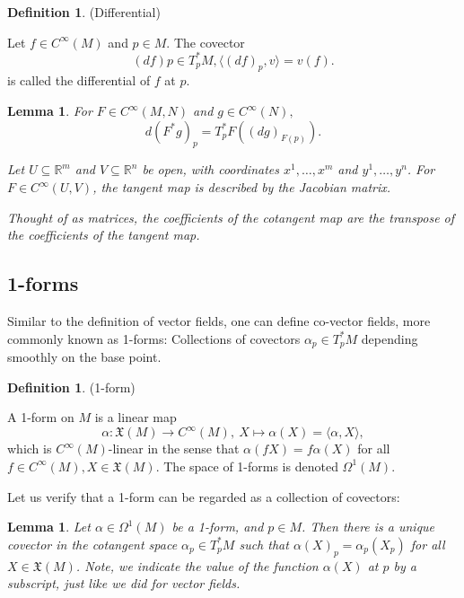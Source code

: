 \documentclass{article}
\newtheorem{lemma}[theorem]{Lemma}
\theoremstyle{definition}
\newtheorem{defn}[theorem]{Definition}
\newenvironment{definition}
  {\vspace{8pt}\begin{mdframed}[backgroundcolor=blueish]\begin{defn}}
  {\end{defn}\end{mdframed}\vspace{4pt}}
\begin{document}
\begin{definition} (Differential)

Let $f \in C^\infty(M)$ and $p \in M$. The covector 
\[
    (d f)p \in T^*_p M,  \langle (d f)_p, v\rangle = v(f).
\]
is called the differential of $f$ at $p$.

\end{definition}

\begin{lemma}
For $F \in C^\infty(M,N)$ and $g \in C^\infty(N),$
\[
    d(F^* g)_p = T^*_p F((dg)_{F(p)}).
\]

Let $U \subseteq \mathbb R^m$ and $V \subseteq \mathbb R^n$ be open, with coordinates $x^1 , \dots , x^m$ and $y^1,\dots, y^n$. For $F \in C^\infty(U,V)$, the tangent map is described by the Jacobian matrix.

Thought of as matrices, the coefficients of the cotangent map are the transpose of the coefficients of the tangent map.
\end{lemma}

\subsection{1-forms}

Similar to the definition of vector fields, one can define co-vector fields, more commonly known as 1-forms: Collections of covectors $\alpha_p \in T^*_p M$ depending smoothly on the base point. 

\begin{definition} (1-form)

A 1-form on $M$ is a linear map 
\[
    \alpha : \mathfrak X(M) \rightarrow C^\infty (M), \  X \mapsto \alpha(X) = \langle \alpha, X \rangle,
\]
which is $C^\infty(M)$-linear in the sense that $\alpha(f X) = f\alpha(X)$ for all $f \in C^\infty(M), X \in \mathfrak X(M)$. The space of 1-forms is denoted $\Omega^1 (M)$.

\end{definition}

Let us verify that a 1-form can be regarded as a collection of covectors:

\begin{lemma}
Let $\alpha \in \Omega^1 (M)$ be a 1-form, and $p \in M$. Then there is a unique covector in the cotangent space $\alpha_p \in T^*_p M$ such that $\alpha(X)_p = \alpha_p(X_p)$ for all $X \in \mathfrak X(M)$. Note, we indicate the value of the function $\alpha(X)$ at $p$ by a subscript, just like we did for
vector fields.
\end{lemma}
\end{document}
